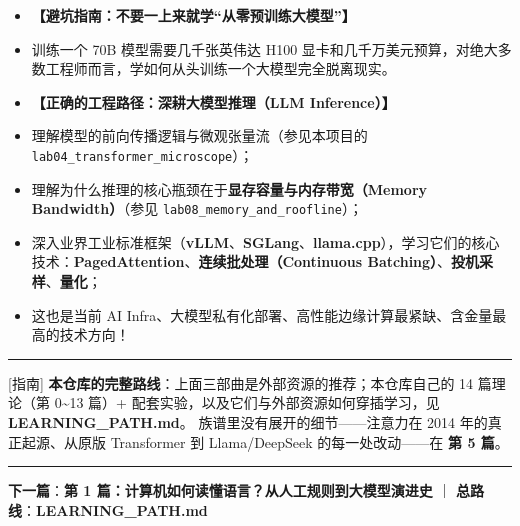 \begin{itemize}
  \item \textbf{【避坑指南：不要一上来就学“从零预训练大模型”】}
  \item 训练一个 70B 模型需要几千张英伟达 H100 显卡和几千万美元预算，对绝大多数工程师而言，学如何从头训练一个大模型完全脱离现实。
  \item \textbf{【正确的工程路径：深耕大模型推理（LLM Inference）】}
  \item 理解模型的前向传播逻辑与微观张量流（参见本项目的 \texttt{lab04\_transformer\_microscope}）；
  \item 理解为什么推理的核心瓶颈在于\textbf{显存容量与内存带宽（Memory Bandwidth）}（参见 \texttt{lab08\_memory\_and\_roofline}）；
  \item 深入业界工业标准框架（\textbf{vLLM}、\textbf{SGLang}、\textbf{llama.cpp}），学习它们的核心技术：\textbf{PagedAttention}、\textbf{连续批处理（Continuous Batching）}、\textbf{投机采样}、\textbf{量化}；
  \item 这也是当前 AI Infra、大模型私有化部署、高性能边缘计算最紧缺、含金量最高的技术方向！
\end{itemize}

\vspace{0.8em}\hrule\vspace{0.8em}

\begin{noteBox}[核心导读与背景]
{}[指南] \textbf{本仓库的完整路线}：上面三部曲是外部资源的推荐；本仓库自己的 14 篇理论（第 0\textasciitilde{}13 篇）+ 配套实验，以及它们与外部资源如何穿插学习，见 \textbf{LEARNING\_PATH.md}。
族谱里没有展开的细节——注意力在 2014 年的真正起源、从原版 Transformer 到 Llama/DeepSeek 的每一处改动——在 \textbf{第 5 篇}。
\end{noteBox}

\vspace{0.8em}\hrule\vspace{0.8em}

\textbf{下一篇}：\textbf{第 1 篇：计算机如何读懂语言？从人工规则到大模型演进史} ｜ \textbf{总路线}：\textbf{LEARNING\_PATH.md}
